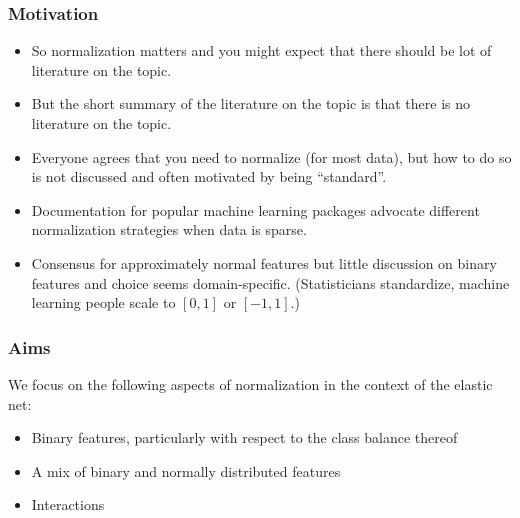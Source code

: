 \documentclass[10pt]{beamer}
\begin{document}
\begin{frame}[c]
  \frametitle{Motivation}

  \begin{itemize}[<+->]
    \item So normalization matters and you might expect that there should be lot of literature on the topic.
    \item But the short summary of the literature on the topic is that there is no literature on the topic.
    \item Everyone agrees that you need to normalize (for most data), but how to do so is not discussed and often motivated by being ``standard''.
    \item Documentation for popular machine learning packages advocate different normalization strategies when data is sparse.
    \item Consensus for approximately normal features but little discussion on binary features and choice seems domain-specific. (Statisticians standardize, machine learning people scale to $[0, 1]$ or $[-1, 1]$.)
  \end{itemize}
\end{frame}

\begin{frame}
  \frametitle{Aims}

  We focus on the following aspects of normalization in the context of the elastic net:
  \begin{itemize}
    \item Binary features, particularly with respect to the \alert{class balance} thereof
    \item A mix of binary and normally distributed features
    \item Interactions
  \end{itemize}


\end{frame}
\end{document}
